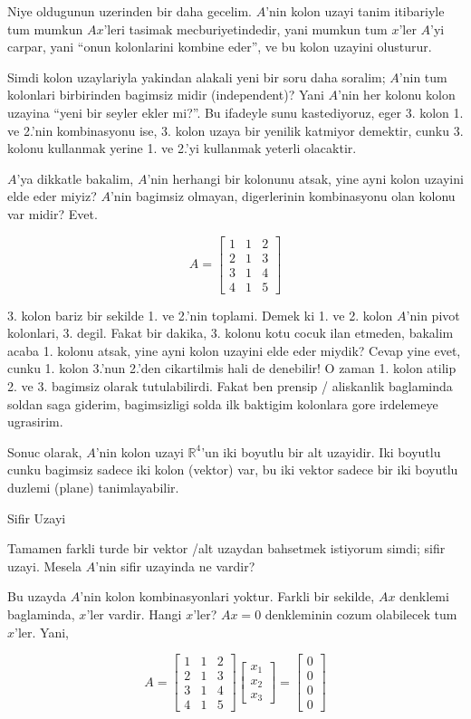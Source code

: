 \documentclass[12pt,fleqn]{article}\usepackage{../common}
\begin{document}
Niye oldugunun uzerinden bir daha gecelim. $A$'nin kolon uzayi tanim
itibariyle tum mumkun $Ax$'leri tasimak mecburiyetindedir, yani mumkun tum
$x$'ler $A$'yi carpar, yani ``onun kolonlarini kombine eder'', ve bu kolon
uzayini olusturur. 

Simdi kolon uzaylariyla yakindan alakali yeni bir soru daha soralim;
$A$'nin tum kolonlari birbirinden bagimsiz midir (independent)? Yani
$A$'nin her kolonu kolon uzayina ``yeni bir seyler ekler mi?''. Bu ifadeyle
sunu kastediyoruz, eger 3. kolon 1. ve 2.'nin kombinasyonu ise, 3. kolon
uzaya bir yenilik katmiyor demektir, cunku 3. kolonu kullanmak yerine 1. ve
2.'yi kullanmak yeterli olacaktir. 

$A$'ya dikkatle bakalim, $A$'nin herhangi bir kolonunu atsak, yine ayni
kolon uzayini elde eder miyiz? $A$'nin bagimsiz olmayan, digerlerinin
kombinasyonu olan kolonu var midir? Evet. 

$$ A = 
\left[\begin{array}{rrr}
1 & 1 & 2 \\
2 & 1 & 3 \\
3 & 1 & 4 \\
4 & 1 & 5 
\end{array}\right]
 $$

3. kolon bariz bir sekilde 1. ve 2.'nin toplami. Demek ki 1. ve 2. kolon
$A$'nin pivot kolonlari, 3. degil. Fakat bir dakika, 3. kolonu kotu cocuk
ilan etmeden, bakalim acaba 1. kolonu atsak, yine ayni kolon uzayini elde
eder miydik? Cevap yine evet, cunku 1. kolon 3.'nun 2.'den cikartilmis hali
de denebilir! O zaman 1. kolon atilip 2. ve 3. bagimsiz olarak
tutulabilirdi. Fakat ben prensip / aliskanlik baglaminda  soldan
saga giderim, bagimsizligi solda ilk baktigim kolonlara gore
irdelemeye ugrasirim.

Sonuc olarak, $A$'nin kolon uzayi $\mathbb{R}^4$'un iki boyutlu bir alt
uzayidir. Iki boyutlu cunku bagimsiz sadece iki kolon (vektor) var, bu iki
vektor sadece bir iki boyutlu duzlemi (plane) tanimlayabilir. 

Sifir Uzayi

Tamamen farkli turde bir vektor /alt uzaydan bahsetmek istiyorum simdi; sifir
uzayi. Mesela $A$'nin sifir uzayinda ne vardir? 

Bu uzayda $A$'nin kolon kombinasyonlari yoktur. Farkli bir sekilde, $Ax$
denklemi baglaminda, $x$'ler vardir. Hangi $x$'ler? $Ax=0$ denkleminin cozum
olabilecek tum $x$'ler. Yani,

$$ A = 
\left[\begin{array}{rrr}
1 & 1 & 2 \\
2 & 1 & 3 \\
3 & 1 & 4 \\
4 & 1 & 5 
\end{array}\right]
\left[\begin{array}{r}
x_1  \\
x_2  \\
x_3  
\end{array}\right] 
=
\left[\begin{array}{r}
0  \\
0  \\
0  \\
0  
\end{array}\right]
 $$
\end{document}
